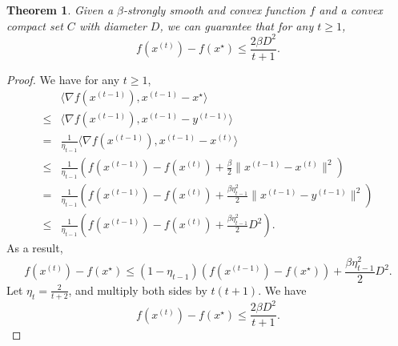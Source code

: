 \documentclass[openany]{book}
\newtheorem{theorem}{Theorem}[chapter]
\theoremstyle{definition}
\theoremstyle{remark}
\begin{document}
\begin{theorem}
    Given a $\beta$-strongly smooth and convex function $f$ and a convex compact set $C$ with diameter $D$, we can guarantee that for any $t\ge1$,
    \begin{equation}\label{FABound}
        f(x^{(t)})-f(x^{\star})\le \frac{2\beta D^2}{t+1}.
    \end{equation}
\end{theorem}
\begin{proof}
    We have for any $t\ge1$,
    \begin{equation*}
        \begin{split}
             & \langle\nabla f(x^{(t-1)}),x^{(t-1)}-x^{\star}\rangle \\
            \le & \langle\nabla f(x^{(t-1)}),x^{(t-1)}-y^{(t-1)}\rangle \\
            = & \frac{1}{\eta_{t-1}}\langle\nabla f(x^{(t-1)}),x^{(t-1)}-x^{(t)}\rangle \\
            \le & \frac{1}{\eta_{t-1}}\left(f(x^{(t-1)})-f(x^{(t)})+\frac{\beta}{2}\|x^{(t-1)}-x^{(t)}\|^2\right) \\
            = & \frac{1}{\eta_{t-1}}\left(f(x^{(t-1)})-f(x^{(t)})+\frac{\beta\eta_{t-1}^2}{2}\|x^{(t-1)}-y^{(t-1)}\|^2\right) \\
            \le & \frac{1}{\eta_{t-1}}\left(f(x^{(t-1)})-f(x^{(t)})+\frac{\beta\eta_{t-1}^2}{2}D^2\right).
        \end{split}
    \end{equation*}
    As a result,
    \begin{equation*}
        f(x^{(t)})-f(x^{\star})\le(1-\eta_{t-1})(f(x^{(t-1)})-f(x^{\star}))+\frac{\beta\eta_{t-1}^2}{2}D^2.
    \end{equation*}
    Let $\eta_t=\frac{2}{t+2}$, and multiply both sides by $t(t+1)$. We have
    \begin{equation*}
        f(x^{(t)})-f(x^{\star})\le \frac{2\beta D^2}{t+1}.
    \end{equation*}
\end{proof}
\end{document}
